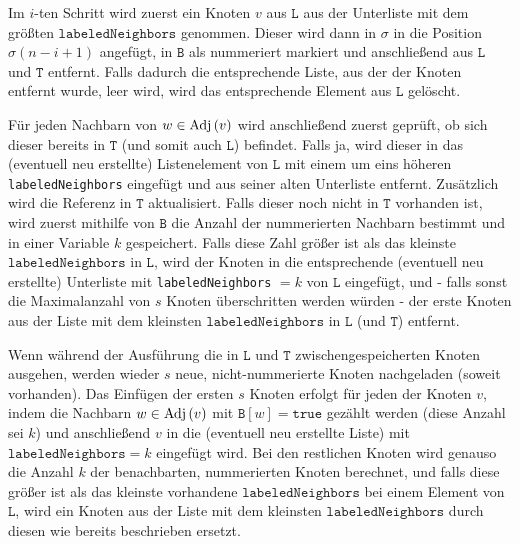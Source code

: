 Im \( i \)-ten Schritt wird zuerst ein Knoten \( v \) aus \( \texttt{L} \) aus der Unterliste mit dem größten \( \texttt{labeledNeighbors} \) genommen. Dieser wird dann in \( \sigma \) in die Position \( \sigma \left( n - i + 1\right) \) angefügt, in \( \texttt{B} \) als nummeriert markiert und anschließend aus \( \texttt{L} \) und \( \texttt{T} \) entfernt. Falls dadurch die entsprechende Liste, aus der der Knoten entfernt wurde, leer wird, wird das entsprechende Element aus \( \texttt{L} \) gelöscht.

Für jeden Nachbarn von \( w \in \textnormal{Adj} \left( v \right) \) wird anschließend zuerst geprüft, ob sich dieser bereits in \( \texttt{T} \) (und somit auch \( \texttt{L} \)) befindet.
Falls ja, wird dieser in das (eventuell neu erstellte) Listenelement von \( \texttt{L} \) mit einem um eins höheren \texttt{labeled\-Neighbors} eingefügt und aus seiner alten Unterliste entfernt. Zusätzlich wird die Referenz in \( \texttt{T} \) aktualisiert.
Falls dieser noch nicht in \( \texttt{T} \) vorhanden ist, wird zuerst mithilfe von \( \texttt{B} \) die Anzahl der nummerierten Nachbarn bestimmt und in einer Variable \( k \) gespeichert. Falls diese Zahl größer ist als das kleinste \( \texttt{labeledNeighbors} \) in \(\texttt{L}\), wird der Knoten in die entsprechende (eventuell neu erstellte) Unterliste mit \texttt{labeled\-Neighbors} \( = k\) von \( \texttt{L} \) eingefügt, und - falls sonst die Maximalanzahl von \( s \) Knoten überschritten werden würden - der erste Knoten aus der Liste mit dem kleinsten \( \texttt{labeledNeighbors} \) in \( \texttt{L} \) (und \( \texttt{T}\)) entfernt.

Wenn während der Ausführung die in \( \texttt{L} \) und \( \texttt{T} \) zwischengespeicherten Knoten ausgehen, werden wieder \( s \) neue, nicht-nummerierte Knoten nachgeladen (soweit vorhanden). Das Einfügen der ersten \( s \) Knoten erfolgt für jeden der Knoten \( v \), indem die  Nachbarn \( w \in \textnormal{Adj} \left( v \right) \) mit \( \texttt{B}\left[w\right] = \texttt{true} \) gezählt werden (diese Anzahl sei \( k \)) und anschließend \( v \) in die (eventuell neu erstellte Liste) mit \( \texttt{labeledNeighbors} = k \) eingefügt wird. Bei den restlichen Knoten wird genauso die Anzahl \( k \) der benachbarten, nummerierten Knoten berechnet, und falls diese größer ist als das kleinste vorhandene \( \texttt{labeledNeighbors} \) bei einem Element von \( \texttt{L} \), wird ein Knoten aus der Liste mit dem kleinsten \( \texttt{labeledNeighbors} \) durch diesen wie bereits beschrieben ersetzt.

